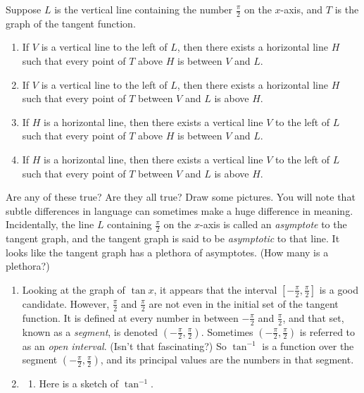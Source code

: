 \documentclass[english]{book}
\begin{document}
Suppose $L$ is the vertical line containing the number $\frac{\pi}{2}$ on the $x$-axis, and $T$ is the graph of the tangent function.

\vfill

\begin{enumerate}[\hspace{1cm}1)]
  \item If $V$ is a vertical line to the left of $L$, then there exists a horizontal line $H$ such that every point of $T$ above $H$ is between $V$ and $L$.
  \item If $V$ is a vertical line to the left of $L$, then there exists a horizontal line $H$ such that every point of $T$ between $V$ and $L$ is above $H$.
  \item If $H$ is a horizontal line, then there exists a vertical line $V$ to the left of $L$ such that every point of $T$ above $H$ is between $V$ and $L$.
  \item If $H$ is a horizontal line, then there exists a vertical line $V$ to the left of $L$ such that every point of $T$ between $V$ and $L$ is above $H$.
\end{enumerate}

\vfill

Are any of these true? Are they all true? Draw some pictures. You will note that subtle differences in language can sometimes make a huge difference in meaning. Incidentally, the line $L$ containing $\frac{\pi}{2}$ on the $x$-axis is called an \emph{asymptote} to the tangent graph, and the tangent graph is said to be \emph{asymptotic} to that line. It looks like the tangent graph has a plethora of asymptotes. (How many is a plethora?)

\vfill

\begin{enumerate}
  \item[\hspace{1cm}b)] Looking at the graph of $\tan x$, it appears that the interval $[-\frac{\pi}{2},\frac{\pi}{2}]$ is a good candidate. However, $\frac{\pi}{2}$ and $\frac{\pi}{2}$ are not even in the initial set of the tangent function. It is defined at every number in between $-\frac{\pi}{2}$ and $\frac{\pi}{2}$, and that set, known as a \emph{segment}, is denoted $(-\frac{\pi}{2},\frac{\pi}{2})$. Sometimes $(-\frac{\pi}{2},\frac{\pi}{2})$ is referred to as an \emph{open interval}. (Isn't that fascinating?) So $\tan^{-1}$ is a function over the segment $(-\frac{\pi}{2},\frac{\pi}{2})$, and its principal values are the numbers in that segment.
  \item[\hspace{1cm}c)] 
    \begin{enumerate}[\hspace{1cm}1)]
      \item Here is a sketch of $\tan^{-1}$.
    \end{enumerate}
\end{enumerate}
\end{document}
